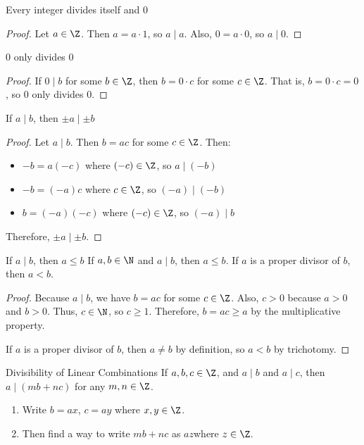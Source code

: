 \documentclass[letterpaper,12pt]{report}
\begin{document}
\begin{thmbox}{Every integer divides itself and $0$}{}
	\begin{proof}
		Let $a \in \Z$. Then $a = a \cdot 1$, so $a \mid a$. Also, $0 = a \cdot 0$, so $a \mid 0$.
	\end{proof}
\end{thmbox}

\begin{thmbox}{0 only divides 0}{}
	\begin{proof}
		If $0 \mid b$ for some $b \in \Z$, then $b = 0 \cdot c$ for some $c \in \Z$. That is, $b = 0 \cdot c = 0$, so $0$ only divides $0$.
	\end{proof}
\end{thmbox}

\begin{thmbox}{If $a \mid b$, then $\pm a \mid \pm b$}{}
	\begin{proof}
		Let $a \mid b$. Then $b = ac$ for some $c \in \Z$. Then:
		\begin{itemize}
			\item $-b = a(-c)$ where $(-c) \in \Z$, so $a \mid (-b)$
			\item $-b = (-a)c$ where $c \in \Z$, so $(-a) \mid (-b)$
			\item $b = (-a)(-c)$ where $(-c) \in \Z$, so $(-a) \mid b$
		\end{itemize}
		Therefore, $\pm a \mid \pm b$.
	\end{proof}
\end{thmbox}

\begin{thmbox}{If $a \mid b$, then $a \leq b$}{}
	If $a,b \in \N$ and $a \mid b$, then $a \leq b$. If $a$ is a proper divisor of $b$, then $a < b$.
	\tcblower
	\begin{proof}
		Because $a \mid b$, we have $b = ac$ for some $c \in \Z$. Also, $c > 0$ because $a>0$ and $b>0$. Thus, $c \in \N$, so $c \geq 1$. Therefore, $b = ac \geq a$ by the multiplicative property.

		If $a$ is a proper divisor of $b$, then $a \neq b$ by definition, so $a < b$ by trichotomy.
	\end{proof}
\end{thmbox}

\begin{thmbox}{Divisibility of Linear Combinations}{}
	If $a,b,c \in \Z$, and $a \mid b$ and $a \mid c$, then $a \mid (mb+nc)$ for any $m,n \in \Z$.
	\tcblower
	\begin{enumerate}
		\item Write $b=ax$, $c=ay$ where $x,y \in \Z$.
		\item Then find a way to write $mb + nc$ as $az$where $z \in \Z$.
	\end{enumerate}
\end{thmbox}
\end{document}
